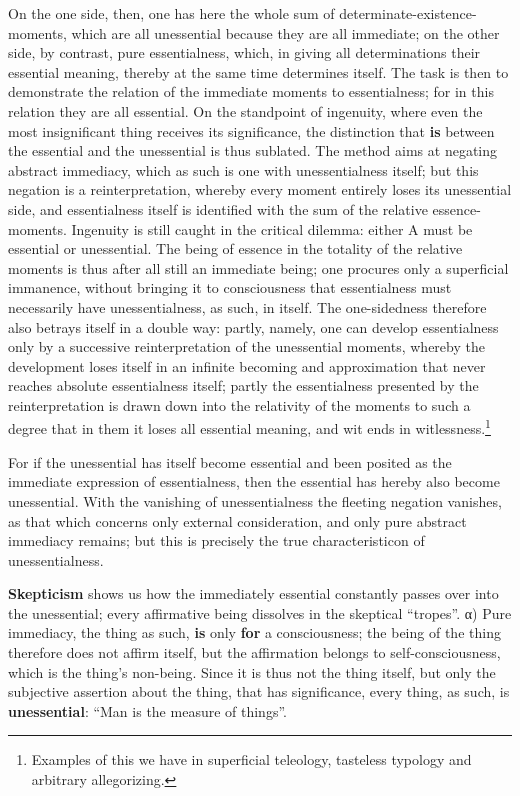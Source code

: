 \documentclass[12pt,a4paper,openany]{book}
\newcommand{\opage}[1]{\marginnote{\footnotesize\textit{[#1]}}}
\begin{document}
On the one side, then, one has here the whole sum of determinate-existence-moments, which are all unessential because they are all immediate; on the other side, by contrast, pure essentialness, which, in giving all determinations their essential meaning, thereby at the same time determines itself. The task is then to demonstrate the relation of the immediate moments to essentialness; for in this relation they are all essential. On the standpoint of ingenuity, where even the most insignificant thing receives its significance, the distinction that \textbf{is} between the essential and the unessential is thus sublated. The method aims at negating abstract immediacy, which as such is one with unessentialness itself; but this negation is a reinterpretation, whereby every moment entirely loses its unessential side, and essentialness itself is identified with the sum of the relative essence-moments. Ingenuity is still caught in the critical dilemma: either A must be essential or unessential. The being of essence in the totality of the relative moments is thus after all still an immediate being; one procures only a superficial immanence, without bringing it to consciousness that essentialness must necessarily have unessentialness, as such, in itself. The one-sidedness therefore also betrays itself in a double way: partly, namely, one can develop essentialness only by a successive reinterpretation of the unessential moments, whereby the development loses itself in an infinite becoming and approximation that never reaches absolute essentialness itself; partly the essentialness presented by the reinterpretation is drawn down into the relativity of the moments to such a degree that in them it
\setcounter{footnote}{0}%
\opage{88}loses all essential meaning, and wit ends in witlessness.\footnote{Examples of this we have in superficial teleology, tasteless typology and arbitrary allegorizing.}

For if the unessential has itself become essential and been posited as the immediate expression of essentialness, then the essential has hereby also become unessential. With the vanishing of unessentialness the fleeting negation vanishes, as that which concerns only external consideration, and only pure abstract immediacy remains; but this is precisely the true characteristicon of unessentialness.

\textbf{Skepticism} shows us how the immediately essential constantly passes over into the unessential; every affirmative being dissolves in the skeptical ``tropes''. α) Pure immediacy, the thing as such, \textbf{is} only \textbf{for} a consciousness; the being of the thing therefore does not affirm itself, but the affirmation belongs to self-consciousness, which is the thing's non-being. Since it is thus not the thing itself, but only the subjective assertion about the thing, that has significance, every thing, as such, is \textbf{unessential}: ``Man is the measure of things''.
\end{document}

